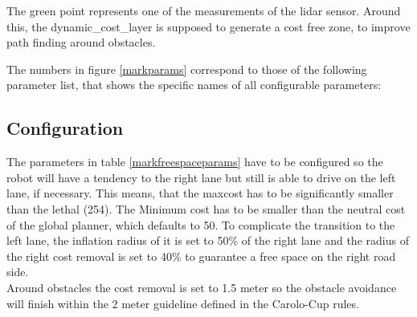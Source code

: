 The green point represents one of the measurements of the lidar sensor. Around this, the dynamic\_cost\_layer is supposed to generate a cost free zone, to improve path finding around obstacles.

The numbers in figure \ref{markparams} correspond to those of the following parameter list, that shows the specific names of all configurable parameters:

\begin{table} 
\centering
{}
\caption{MarkeFreeSpace parameters}
\label{markfreespaceparams}
\end{table}

\subsection{Configuration}

The parameters in table \ref{markfreespaceparams} have to be configured so the robot will have a tendency to the right lane but still is able to drive on the left lane, if necessary. This means, that the maxcost has to be significantly smaller than the lethal (254). The Minimum cost has to be smaller than the neutral cost of the global planner, which defaults to 50. To complicate the transition to the left lane, the inflation radius of it is set to 50\% of the right lane and the radius of the right cost removal  is set to 40\% to guarantee a free space on the right road side.\\
Around obstacles the cost removal is set to 1.5 meter so the obstacle avoidance will finish within the 2 meter guideline defined in the Carolo-Cup rules\cite{carolocup}.\\


